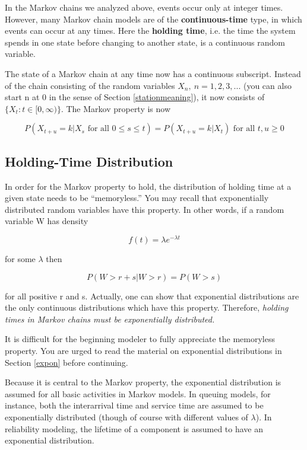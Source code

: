 In the Markov chains we analyzed above, events occur only at integer
times.  However, many Markov chain models are of the
\textbf{continuous-time} type, in which events can occur at any times.
Here the \textbf{holding time}, i.e. the time the system spends in one
state before changing to another state, is a continuous random variable.

The state of a Markov chain at any time now has a continuous subscript.
Instead of the chain consisting of the random variables $X_n, ~ n =
1,2,3,...$  (you can also start n at 0 in the sense of Section
\ref{stationmeaning}), it now consists of $\{X_t: t \in [0,\infty)\}$.
The Markov property is now

\begin{equation}
P(X_{t+u} = k | X_s \textrm{ for all } 0 \leq s \leq t) =
P(X_{t+u} = k | X_t) \textrm{ for all } t,u \geq 0
\end{equation}

\subsection{Holding-Time Distribution}

In order for the Markov property to hold, the distribution of holding
time at a given state needs to be ``memoryless.'' You may recall that
exponentially distributed random variables have this property. In other
words, if a random variable W has density

\begin{equation}
\label{lambdaeqn}
f(t)=\lambda e^{-\lambda t}
\end{equation}

for some $\lambda$ then

\begin{equation}
\label{exponnomem}
P(W>r+s|W>r)=P(W>s)
\end{equation}

for all positive r and s. Actually, one can show that exponential
distributions are the only continuous distributions which have this
property. Therefore, \textsl{holding times in Markov chains must be
exponentially distributed.}  

It is difficult for the beginning modeler to fully appreciate the
memoryless property.  You are urged to read the material on exponential
distributions in Section \ref{expon} before continuing.

Because it is central to the Markov property, the exponential distribution
is assumed for all basic activities in Markov models. In queuing models,
for instance, both the interarrival time and service time are assumed to
be exponentially distributed (though of course with different values of
$\lambda$). In reliability modeling, the lifetime of a component is
assumed to have an exponential distribution.

